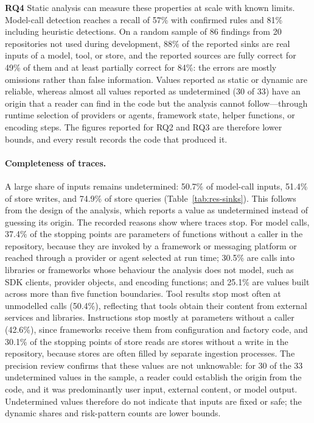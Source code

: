 \textbf{RQ4} Static analysis can measure these properties at scale with known limits. Model-call detection reaches a recall of 57\% with confirmed rules and 81\% including heuristic detections. On a random sample of 86 findings from 20 repositories not used during development, 88\% of the reported sinks are real inputs of a model, tool, or store, and the reported sources are fully correct for 49\% of them and at least partially correct for 84\%: the errors are mostly omissions rather than false information. Values reported as static or dynamic are reliable, whereas almost all values reported as undetermined (30 of 33) have an origin that a reader can find in the code but the analysis cannot follow---through runtime selection of providers or agents, framework state, helper functions, or encoding steps. The figures reported for RQ2 and RQ3 are therefore lower bounds, and every result records the code that produced it.

\paragraph{Completeness of traces.} A large share of inputs remains undetermined: 50.7\% of model-call inputs, 51.4\% of store writes, and 74.9\% of store queries (Table~\ref{tab:res-sinks}). This follows from the design of the analysis, which reports a value as undetermined instead of guessing its origin. The recorded reasons show where traces stop. For model calls, 37.4\% of the stopping points are parameters of functions without a caller in the repository, because they are invoked by a framework or messaging platform or reached through a provider or agent selected at run time; 30.5\% are calls into libraries or frameworks whose behaviour the analysis does not model, such as SDK clients, provider objects, and encoding functions; and 25.1\% are values built across more than five function boundaries. Tool results stop most often at unmodelled calls (50.4\%), reflecting that tools obtain their content from external services and libraries. Instructions stop mostly at parameters without a caller (42.6\%), since frameworks receive them from configuration and factory code, and 30.1\% of the stopping points of store reads are stores without a write in the repository, because stores are often filled by separate ingestion processes. The precision review confirms that these values are not unknowable: for 30 of the 33 undetermined values in the sample, a reader could establish the origin from the code, and it was predominantly user input, external content, or model output. Undetermined values therefore do not indicate that inputs are fixed or safe; the dynamic shares and risk-pattern counts are lower bounds.

